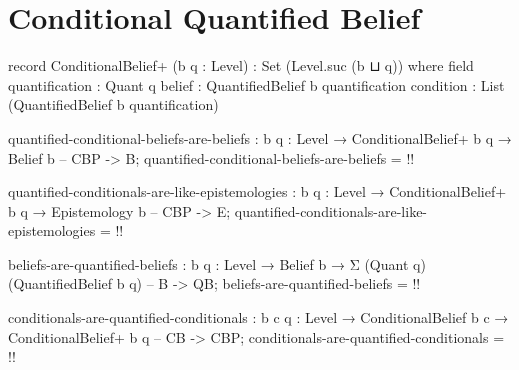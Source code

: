 \documentclass{article}
\begin{document}
\section{Conditional Quantified Belief}

\begin{code}
record ConditionalBelief+ (b q : Level) : Set (Level.suc (b ⊔ q)) where
  field
    quantification : Quant q
    belief : QuantifiedBelief b quantification
    condition : List (QuantifiedBelief b quantification)
\end{code}

\begin{code}
quantified-conditional-beliefs-are-beliefs :
  {b q : Level} → ConditionalBelief+ b q → Belief b -- CBP -> B;
quantified-conditional-beliefs-are-beliefs = {!!}
\end{code}

\begin{code}
quantified-conditionals-are-like-epistemologies :
  {b q : Level} → ConditionalBelief+ b q → Epistemology b -- CBP -> E;
quantified-conditionals-are-like-epistemologies = {!!}
\end{code}

\begin{code}
beliefs-are-quantified-beliefs :
  {b q : Level} → Belief b → Σ (Quant q) (QuantifiedBelief b {q}) -- B -> QB;
beliefs-are-quantified-beliefs = {!!}
\end{code}

\begin{code}
conditionals-are-quantified-conditionals :
  {b c q : Level} → ConditionalBelief b c → ConditionalBelief+ b q -- CB -> CBP;
conditionals-are-quantified-conditionals = {!!}
\end{code}
\end{document}
